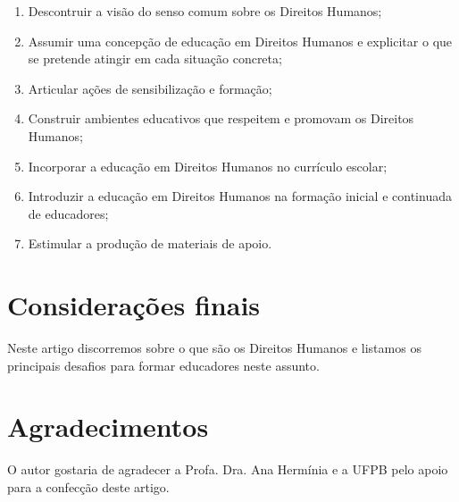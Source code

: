 \documentclass[
	article,			%
	11pt,				%
	oneside,			%
	a4paper,			%
	english,			%
	brazil,				%
	sumario=tradicional
]{abntex2}
\begin{document}
\begin{enumerate}
	\item Descontruir a visão do senso comum sobre os Direitos Humanos;
	\item Assumir uma concepção de educação em Direitos Humanos e explicitar
		  o que se pretende atingir em cada situação concreta;
	\item Articular ações de sensibilização e formação;
	\item Construir ambientes educativos que respeitem e promovam os Direitos
		  Humanos;
	\item Incorporar a educação em Direitos Humanos no currículo escolar;
	\item Introduzir a educação em Direitos Humanos na formação inicial e
		  continuada de educadores;
	\item Estimular a produção de materiais de apoio.
\end{enumerate}


\section{Considerações finais}

Neste artigo discorremos sobre o que são os Direitos Humanos e listamos os
principais desafios para formar educadores neste assunto.  




\postextual





\section*{Agradecimentos}
O autor gostaria de agradecer a Profa. Dra. Ana Hermínia e a UFPB pelo apoio
para a confecção deste artigo.
\end{document}
